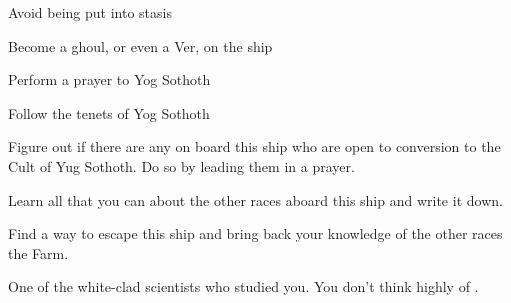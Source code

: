 \documentclass[char]{guildcamp4}
\begin{document}
\begin{itemz}[Goals]
	\item Avoid being put into stasis
	\item Become a ghoul, or even a Ver, on the ship
	\item Perform a prayer to Yog Sothoth
	\item Follow the tenets of Yog Sothoth
	\item Figure out if there are any on board this ship who are open to conversion to the Cult of Yug Sothoth. Do so by leading them in a prayer.
	\item Learn all that you can about the other races aboard this ship and write it down.
	\item Find a way to escape this ship and bring back your knowledge of the other races the Farm.
\end{itemz}

\begin{contacts}
	\contact{\cSpite{}} One of the white-clad scientists who studied you. You don't think highly of \cSpite{\them}.
\end{contacts}
\end{document}
